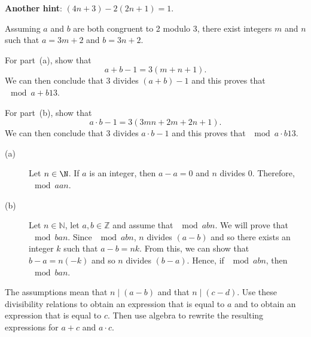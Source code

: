 \begin{list}{\bf{\ref{exer:sec31-10}.}}
\item \textbf{Another hint}:  $\left( 4n + 3 \right) - 2 \left( 2n + 1 \right) = 1$.
\end{list}


\begin{list}{\bf{\ref{exer:congmod3}.}}
\item Assuming $a$ and $b$ are both congruent to 2 modulo 3, there exist integers $m$ and $n$ such that $a = 3m + 2$ and $b = 3n + 2$.  

 For part~(a), show that
\[
a + b - 1 = 3 \left( m + n + 1 \right).
\]
We can then conclude that 3 divides $(a + b) - 1$ and this proves that $\mod{a+b}{1}{3}$.

For part~(b), show that 
\[
a \cdot b - 1 = 3(3mn + 2m + 2n + 1).
\]
We can then conclude that 3 divides $a \cdot b- 1$ and this proves that $\mod{a \cdot b}{1}{3}$.
\end{list}

\begin{list}{\bf{\ref{exer:cong-props}.}}
\item \begin{description}
\item[(a)] Let $n \in \N$.  If $a$ is an integer, then $a - a = 0$ and $n$ divides 0.  Therefore, $\mod{a}{a}{n}$.
\item[(b)] Let  $n \in \mathbb{N}$, let $a, b \in \mathbb{Z}$ and assume that $\mod{a}{b}{n}$.  We will prove that $\mod{b}{a}{n}$.  Since $\mod{a}{b}{n}$, $n$ divides $(a - b)$ and so there exists an integer $k$ such that $a - b = nk$.  From this, we can show that
$b - a = n(-k)$ and so $n$ divides $(b - a)$.  Hence, if $\mod{a}{b}{n}$, then $\mod{b}{a}{n}$.
\end{description}
\end{list}



\begin{list}{\bf{\ref{exer:sec31-11}.}}
\item The assumptions mean that $n \mid \left( a-b \right)$ and that 
$n \mid \left( c-d \right)$.  Use these divisibility relations to obtain an expression that is equal to  $a$  and to obtain an expression that is equal to  $c$.  Then use algebra to rewrite the resulting expressions for $a + c$    and $a \cdot c$.
\end{list}
\hbreak
\renewcommand{\labelenumi}{\textbf{\arabic{enumi}.}}

\endinput
